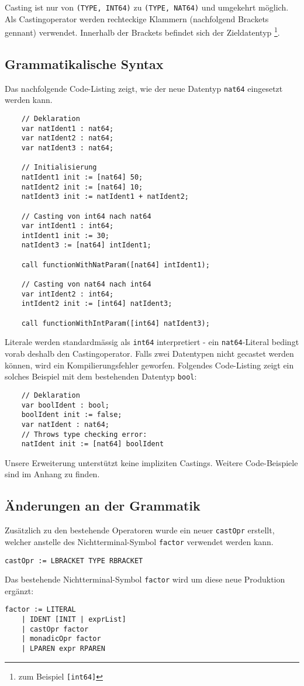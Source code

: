 \documentclass[10pt, a4paper, twocolumn]{article} %
\begin{document}
Casting ist nur von \texttt{(TYPE, INT64)} zu \texttt{(TYPE, NAT64)} und umgekehrt möglich.
Als Castingoperator werden rechteckige Klammern (nachfolgend Brackets gennant) verwendet.
Innerhalb der Brackets befindet sich der Zieldatentyp \footnote{zum Beispiel \texttt{[int64]}}.

\subsection{Grammatikalische Syntax}
Das nachfolgende Code-Listing zeigt, wie der neue Datentyp \texttt{nat64} eingesetzt werden kann.
\begin{lstlisting}
    // Deklaration
    var natIdent1 : nat64;
    var natIdent2 : nat64;
    var natIdent3 : nat64;

    // Initialisierung
    natIdent1 init := [nat64] 50;
    natIdent2 init := [nat64] 10;
    natIdent3 init := natIdent1 + natIdent2;

    // Casting von int64 nach nat64
    var intIdent1 : int64;
    intIdent1 init := 30;
    natIdent3 := [nat64] intIdent1;

    call functionWithNatParam([nat64] intIdent1);

    // Casting von nat64 nach int64
    var intIdent2 : int64;
    intIdent2 init := [int64] natIdent3;

    call functionWithIntParam([int64] natIdent3);
\end{lstlisting}
Literale werden standardmässig als \texttt{int64} interpretiert - ein \texttt{nat64}-Literal bedingt vorab deshalb den Castingoperator.
Falls zwei Datentypen nicht gecastet werden können, wird ein Kompilierungsfehler geworfen.
Folgendes Code-Listing zeigt ein solches Beispiel mit dem bestehenden Datentyp \texttt{bool}:
\begin{lstlisting}
    // Deklaration
    var boolIdent : bool;
    boolIdent init := false;
    var natIdent : nat64;
    // Throws type checking error:
    natIdent init := [nat64] boolIdent
\end{lstlisting}
Unsere Erweiterung unterstützt keine impliziten Castings.
Weitere Code-Beispiele sind im Anhang zu finden.

\subsection{Änderungen an der Grammatik}

Zusätzlich zu den bestehende Operatoren wurde ein neuer \texttt{castOpr} erstellt, welcher anstelle des Nichtterminal-Symbol \texttt{factor} verwendet werden kann.
\begin{lstlisting}[backgroundcolor = \color{lightgray},
xleftmargin = 0.05cm,
framexleftmargin = 0.05em]
    castOpr := LBRACKET TYPE RBRACKET
\end{lstlisting}
Das bestehende Nichtterminal-Symbol \texttt{factor} wird um diese neue Produktion ergänzt:
\begin{lstlisting}[backgroundcolor = \color{lightgray},
xleftmargin = 0.05cm,
framexleftmargin = 0.05em]
    factor := LITERAL
    | IDENT [INIT | exprList]
    | castOpr factor
    | monadicOpr factor
    | LPAREN expr RPAREN
\end{lstlisting}
\end{document}

